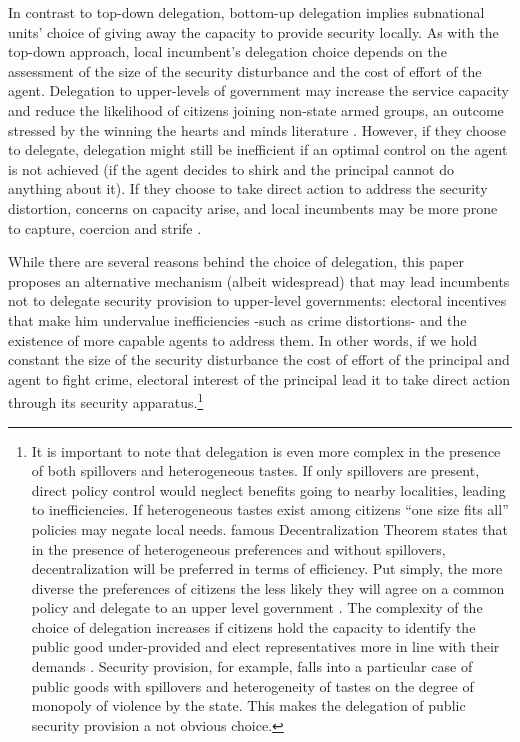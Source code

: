 \documentclass[12pt]{amsart}
\numberwithin{equation}{section}
\theoremstyle{definition}
\theoremstyle{definition}
\theoremstyle{definition}
\begin{document}
In contrast to top-down delegation, bottom-up delegation implies subnational units’ choice of giving away the capacity to provide security locally. As with the top-down approach, local incumbent’s delegation choice depends on the assessment of the size of the security disturbance and the cost of effort of the agent. Delegation to upper-levels of government may increase the service capacity and reduce the likelihood of citizens joining non-state armed groups, an outcome stressed by the winning the hearts and minds literature \citep{beath_etal_2013, berman_etal_2011, dell_querubin_2018}. However, if they choose to delegate, delegation might still be inefficient if an optimal control on the agent is not achieved (if the agent decides to shirk and the principal cannot do anything about it). If they choose to take direct action to address the security distortion, concerns on capacity arise, and local incumbents may be more prone to capture, coercion and strife \citet{chacon_2018}.

While there are several reasons behind the choice of delegation, this paper proposes an alternative mechanism (albeit widespread) that may lead incumbents not to delegate security provision to upper-level governments: electoral incentives that make him undervalue inefficiencies -such as crime distortions- and the existence of more capable agents to address them. In other words, if we hold constant the size of the security disturbance the cost of effort of the principal and agent to fight crime, electoral interest of the principal lead it to take direct action through its security apparatus.\footnote{It is important to note that delegation is even more complex in the presence of both spillovers and heterogeneous tastes. If only spillovers are present, direct policy control would neglect benefits going to nearby localities, leading to inefficiencies. If heterogeneous tastes exist among citizens ``one size fits all” policies may negate local needs. \citet{oates_1972} famous Decentralization Theorem states that in the presence of heterogeneous preferences and without spillovers, decentralization will be preferred in terms of efficiency. Put simply, the more diverse the preferences of citizens the less likely they will agree on a common policy and delegate to an upper level government \citep{martin_2006, lyne_etal_2006}. The complexity of the choice of delegation increases if citizens hold the capacity to identify the public good under-provided and elect representatives more in line with their demands \citet{besley_oates_2003}. Security provision, for example, falls into a particular case of public goods with spillovers and heterogeneity of tastes on the degree of monopoly of violence by the state. This makes the delegation of public security provision a not obvious choice.}
\end{document}
